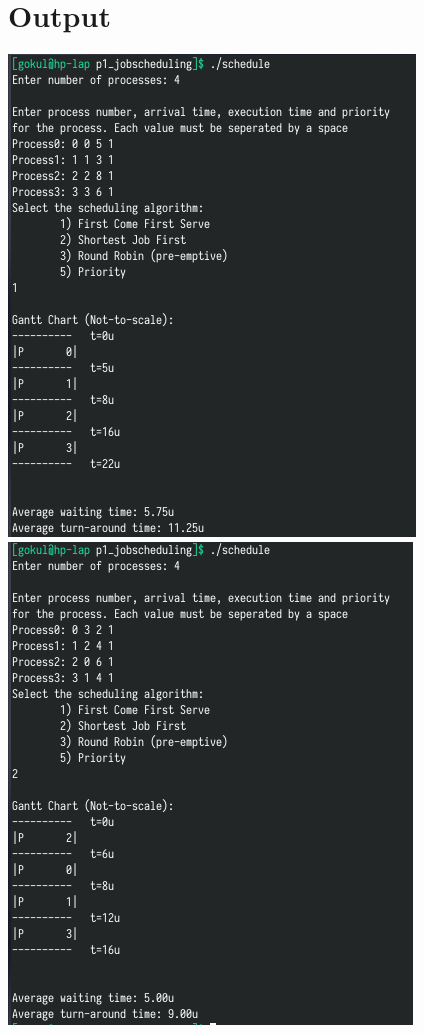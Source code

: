 \documentclass[13pt,oneside]{book}
\begin{document}
\section*{Output}
\includegraphics[]{img/p1/ss1.png} \\
\includegraphics[]{img/p1/ss2.png} \\
\end{document}
